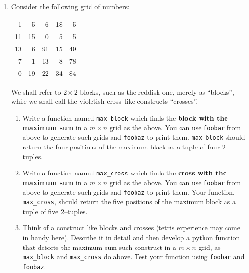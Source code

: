 \documentclass[a4paper, 11pt]{article}
\theoremstyle{definition}
\begin{document}
\begin{enumerate}[label = E\arabic*.]
\begin{lstlisting}[language=Python]
if __name__ == "__main__":
	a = foobar()
	b = foobar(15, 15)
	c = foobar(10, 10, 10, 200)
	print(f"a:\n{foobaz(a)}")
	print(f"b:\n{foobaz(b)}")
	print(f"c:\n{foobaz(c)}")
		\end{lstlisting}
		\begin{enumerate}
			\item What is the purpose of \texttt{foobar}?
			\item What is the purpose of \texttt{foobaz}?
			\item What does \texttt{lambda} mean in python?
			\item What are \texttt{digits} and \texttt{pad} computing in \texttt{foobaz}?
			\item What will this print?
		\end{enumerate}
		\item Consider the following grid of numbers:
		\begin{table}[!htb]
			\centering
			\def\arraystretch{1.5}
			\begin{tabular}{rrrrr}
				\cellcolor{c1} 1 & \cellcolor{c1} 5 &  6 & 18 &  5 \\
				\cellcolor{c1}11 & \cellcolor{c1}15 &  0 &  5 &  5 \\
				13 &  6 & 91 & \cellcolor{c2} 15 & 49 \\
				 7 &  1 & \cellcolor{c2} 13 & \cellcolor{c2}  8 & \cellcolor{c2} 78 \\
				 0 & 19 & 22 & \cellcolor{c2} 34 & 84 \\
			\end{tabular}
		\end{table}
	
		We shall refer to $2\times2$ blocks, such as the \textcolor{c1}{reddish} one, merely as ``blocks'', while we shall call the \textcolor{c2}{violetish} cross--like constructs ``crosses''.
		\begin{enumerate}
			\item Write a function named \texttt{max\_block} which finds the \textbf{block with the maximum sum} in a $m\times n$ grid as the above. You can use \texttt{foobar} from above to generate such grids and \texttt{foobaz} to print them. \texttt{max\_block} should return the four positions of the maximum block as a tuple of four 2--tuples.
			\item Write a function named \texttt{max\_cross} which finds the \textbf{cross with the maximum sum} in a $m\times n$ grid as the above. You can use \texttt{foobar} from above to generate such grids and \texttt{foobaz} to print them. Your function, \texttt{max\_cross}, should return the five positions of the maximum block as a tuple of five 2--tuples.
			\item Think of a construct like blocks and crosses (tetris experience may come in handy here). Describe it in detail and then develop a python function that detects the maximum sum such construct in a $m\times n$ grid, as \texttt{max\_block} and \texttt{max\_cross} do above. Test your function using \texttt{foobar} and \texttt{foobaz}.
		\end{enumerate}
	\end{enumerate}
\end{document}
